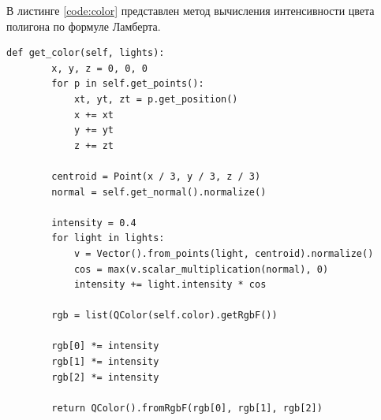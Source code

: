 В листинге \ref{code:color} представлен метод вычисления интенсивности цвета полигона по формуле Ламберта. 
\begin{lstlisting}[caption= Метод рассчёта интенсивности цвета полигона, label=code:color]
	def get_color(self, lights):
		x, y, z = 0, 0, 0
		for p in self.get_points():
			xt, yt, zt = p.get_position()
			x += xt
			y += yt
			z += zt
		
		centroid = Point(x / 3, y / 3, z / 3)
		normal = self.get_normal().normalize()
		
		intensity = 0.4
		for light in lights:
			v = Vector().from_points(light, centroid).normalize()
			cos = max(v.scalar_multiplication(normal), 0)
			intensity += light.intensity * cos
			
		rgb = list(QColor(self.color).getRgbF())
		
		rgb[0] *= intensity
		rgb[1] *= intensity
		rgb[2] *= intensity
		
		return QColor().fromRgbF(rgb[0], rgb[1], rgb[2])
\end{lstlisting}

